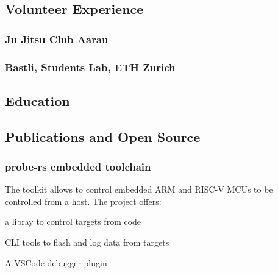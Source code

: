 \begin{timeline}
    
    \subsection{Volunteer Experience}
    
    \subsubsection{Ju Jitsu Club Aarau}
    \sectionsep

    \subsubsection{Bastli, Students Lab, ETH Zurich}
    \sectionsep

    
    \subsection{Education}
    
    \sectionsep
    
    \sectionsep
    
    
    \subsection{Publications and Open Source}

    \subsubsection{probe-rs embedded toolchain}
    The toolkit allows to control embedded ARM and RISC-V MCUs to be controlled from a host.
    The project offers:\\
    \begin{tightemize}
    \item a libray to control targets from code
    \item CLI tools to flash and log data from targets
    \item A VSCode debugger plugin
    \end{tightemize}
    \sectionsep
    

\end{timeline}
